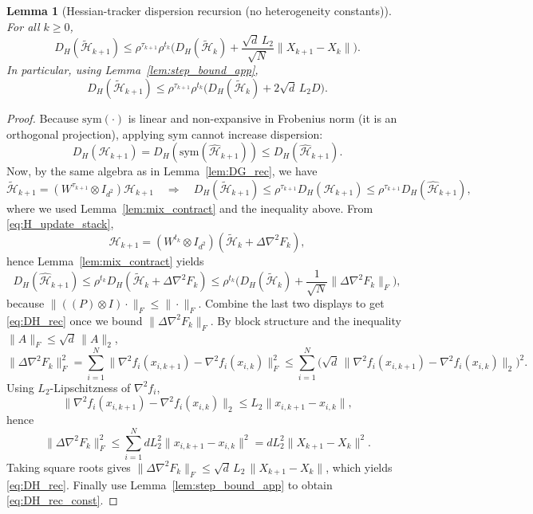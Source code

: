 \documentclass[11pt,a4paper]{article}
\def\one{1}%
\def\J{J}%
\def\Pmat{P}%
\newtheorem{lemma}[theorem]{Lemma}
\newcommand{\one}{\mathbf{1}}
\newcommand{\J}{\left(\frac{1}{N}\one\one^\top\right)}
\newcommand{\Pmat}{I-\J}
\begin{document}
\begin{lemma}[Hessian-tracker dispersion recursion (no heterogeneity constants)]\label{lem:DH_rec}
For all $k\ge0$,
\begin{equation}\label{eq:DH_rec}
D_H(\tilde{\mathcal H}_{k+1})
\le \rho^{\tau_{k+1}}\rho^{t_k}\Big(D_H(\tilde{\mathcal H}_k)+\frac{\sqrt d\,L_2}{\sqrt N}\|X_{k+1}-X_k\|\Big).
\end{equation}
In particular, using Lemma~\ref{lem:step_bound_app},
\begin{equation}\label{eq:DH_rec_const}
D_H(\tilde{\mathcal H}_{k+1})
\le \rho^{\tau_{k+1}}\rho^{t_k}\Big(D_H(\tilde{\mathcal H}_k)+2\sqrt d\,L_2D\Big).
\end{equation}
\end{lemma}
\begin{proof}
Because $\mathrm{sym}(\cdot)$ is linear and non-expansive in Frobenius norm (it is an orthogonal projection),
applying $\mathrm{sym}$ cannot increase dispersion:
\[
D_H(\mathcal H_{k+1})=D_H(\mathrm{sym}(\widehat{\mathcal H}_{k+1}))\le D_H(\widehat{\mathcal H}_{k+1}).
\]
Now, by the same algebra as in Lemma~\ref{lem:DG_rec}, we have
\[
\tilde{\mathcal H}_{k+1}
=(W^{\tau_{k+1}}\otimes I_{d^2})\mathcal H_{k+1}
\quad\Rightarrow\quad
D_H(\tilde{\mathcal H}_{k+1})\le \rho^{\tau_{k+1}}D_H(\mathcal H_{k+1})
\le \rho^{\tau_{k+1}}D_H(\widehat{\mathcal H}_{k+1}),
\]
where we used Lemma~\ref{lem:mix_contract} and the inequality above.
From \eqref{eq:H_update_stack},
\[
\widehat{\mathcal H}_{k+1}=(W^{t_k}\otimes I_{d^2})(\tilde{\mathcal H}_k+\Delta\nabla^2 F_k),
\]
hence Lemma~\ref{lem:mix_contract} yields
\[
D_H(\widehat{\mathcal H}_{k+1})\le \rho^{t_k}D_H(\tilde{\mathcal H}_k+\Delta\nabla^2 F_k)
\le \rho^{t_k}\Big(D_H(\tilde{\mathcal H}_k)+\frac1{\sqrt N}\|\Delta\nabla^2 F_k\|_F\Big),
\]
because $\|((\Pmat)\otimes I)\cdot\|_F\le \|\cdot\|_F$.
Combine the last two displays to get \eqref{eq:DH_rec} once we bound $\|\Delta\nabla^2F_k\|_F$.
By block structure and the inequality $\|A\|_F\le \sqrt d\,\|A\|_2$,
\[
\|\Delta\nabla^2 F_k\|_F^2
=\sum_{i=1}^N\|\nabla^2 f_i(x_{i,k+1})-\nabla^2 f_i(x_{i,k})\|_F^2
\le \sum_{i=1}^N\big(\sqrt d\,\|\nabla^2 f_i(x_{i,k+1})-\nabla^2 f_i(x_{i,k})\|_2\big)^2.
\]
Using $L_2$-Lipschitzness of $\nabla^2 f_i$,
\[
\|\nabla^2 f_i(x_{i,k+1})-\nabla^2 f_i(x_{i,k})\|_2\le L_2\|x_{i,k+1}-x_{i,k}\|,
\]
hence
\[
\|\Delta\nabla^2 F_k\|_F^2\le \sum_{i=1}^N d L_2^2\|x_{i,k+1}-x_{i,k}\|^2 = dL_2^2\|X_{k+1}-X_k\|^2.
\]
Taking square roots gives $\|\Delta\nabla^2 F_k\|_F\le \sqrt d\,L_2\,\|X_{k+1}-X_k\|$,
which yields \eqref{eq:DH_rec}. Finally use Lemma~\ref{lem:step_bound_app} to obtain \eqref{eq:DH_rec_const}.
\end{proof}
\end{document}

